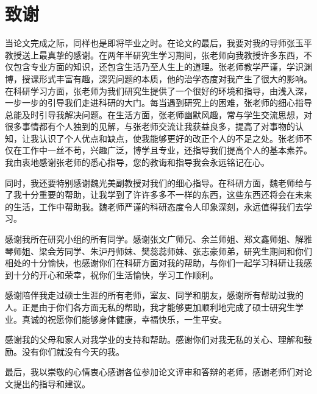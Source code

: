 \chapter{致谢}
当论文完成之际，同样也是即将毕业之时。在论文的最后，我要对我的导师张玉平教授送上最真挚的感谢。在两年半研究生学习期间，张老师向我教授许多东西，不仅包含专业方面的知识，还包含生活乃至人生上的道理。张老师教学严谨，学识渊博，授课形式丰富有趣，深究问题的本质，他的治学态度对我产生了很大的影响。在科研学习方面，张老师为我们研究生提供了一个很好的环境和指导，由浅入深，一步一步的引导我们走进科研的大门。每当遇到研究上的困难，张老师的细心指导总能及时引导我解决问题。在生活方面，张老师幽默风趣，常与学生交流思想，对很多事情都有个人独到的见解，与张老师交流让我获益良多，提高了对事物的认知，让我认识了个人优点和缺点，使我能够更好的改正个人的不足之处。张老师不仅在工作中一丝不苟，兴趣广泛，博学且专业，还指导我们提高个人的基本素养。我由衷地感谢张老师的悉心指导，您的教诲和指导我会永远铭记在心。

同时，我还要特别感谢魏光美副教授对我们的细心指导。在科研方面，魏老师给与了我十分重要的帮助，让我学到了许许多多不一样的东西，这些东西还将会在未来的生活，工作中帮助我。魏老师严谨的科研态度令人印象深刻，永远值得我们去学习。

感谢我所在研究小组的所有同学。感谢张文广师兄、余兰师姐、郑文鑫师姐、解雅琴师姐、梁会芳同学、朱沪丹师妹、樊蕊蕊师妹、张志豪师弟，研究生期间和你们相处的十分愉快，也感谢你们在科研方面对我的帮助，与你们一起学习科研让我感到十分的开心和荣幸，祝你们生活愉快，学习工作顺利。

感谢陪伴我走过硕士生涯的所有老师，室友、同学和朋友，感谢所有帮助过我的人。正是由于你们各方面无私的帮助，我才能够更加顺利地完成了硕士研究生学业。真诚的祝愿你们能够身体健康，幸福快乐，一生平安。

感谢我的父母和家人对我学业的支持和帮助。感谢你们对我无私的关心、理解和鼓励。没有你们就没有今天的我。


最后，我以崇敬的心情衷心感谢各位参加论文评审和答辩的老师，感谢老师们对论文提出的指导和建议。








